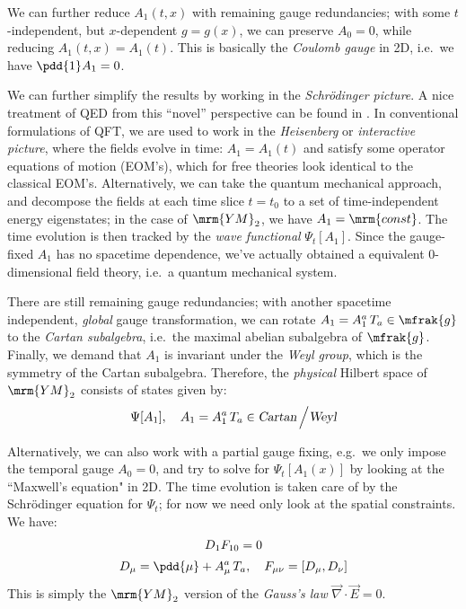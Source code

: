 \documentclass[a4paper
	,10pt
]{article}
\newcommand{\YM}{{\ensuremath{\mrm{YM}_2}}\xspace}
\begin{document}
	We can further reduce $A_1(t,x)$ with remaining gauge redundancies; with some $t$-independent, but $x$-dependent $g = g(x)$, we can preserve $A_0 = 0$, while reducing $A_1(t,x) = A_1(t)$. This is basically the \textit{Coulomb gauge} in 2D, i.e.~we have $\pdd{1} A_1 = 0$. 
	
	We can further simplify the results by working in the \textit{Schr\"odinger picture}. A nice treatment of QED from this ``novel'' perspective can be found in \cite{Hatfield:234595}. In conventional formulations of QFT, we are used to work in the \textit{Heisenberg} or \textit{interactive picture}, where the fields evolve in time: $A_1 = A_1(t)$ and satisfy some operator equations of motion (EOM's), which for free theories look identical to the classical EOM's. Alternatively, we can take the quantum mechanical approach, and decompose the fields at each time slice $t = t_0$ to a set of time-independent energy eigenstates; in the case of \YM, we have $A_1 = \mrm{const}$. 
	The time evolution is then tracked by the \textit{wave functional} $\Psi_t[A_1]$. Since the gauge-fixed $A_1$ has no spacetime dependence, we've actually obtained a equivalent 0-dimensional field theory, i.e.~a quantum mechanical system. 
	
	There are still remaining gauge redundancies; with another spacetime independent, \textit{global} gauge transformation, we can rotate $
		A_1 = A_1^a\,T_a \in \mfrak{g}
	$ to the \textit{Cartan subalgebra}, i.e.~the maximal abelian subalgebra of $\mfrak{g}$. Finally, we demand that $A_1$ is invariant under the \textit{Weyl group}, which is the symmetry of the Cartan subalgebra. Therefore, the \textit{physical} Hilbert space of \YM consists of states given by:
	\begin{equation}
		\Psi[A_1],\quad
		A_1
		= A_1^a\,T_a
		\in \textsl{Cartan} \,\Big/ \textsl{Weyl}
	\end{equation}
	
	Alternatively, we can also work with a partial gauge fixing, e.g.~we only impose the temporal gauge $A_0 = 0$, and try to solve for $\Psi_t[A_1(x)]$ by looking at the ``Maxwell's equation" in 2D. The time evolution is taken care of by the Schr\"odinger equation for $\Psi_t$; for now we need only look at the spatial constraints. We have:
	\begin{gather}
		D_1 F_{10} = 0
	\label{eq:gauss_law_constraint}
	\\[.5ex]
		D_\mu = \pdd{\mu} + A^a_\mu\,T_a,
	\quad
		F_{\mu\nu} = [D_\mu,D_\nu]
	\end{gather}
	This is simply the \YM version of the \textit{Gauss's law} $\vec{\nabla}\cdot\vec{E} = 0$. 
	
\end{document}
